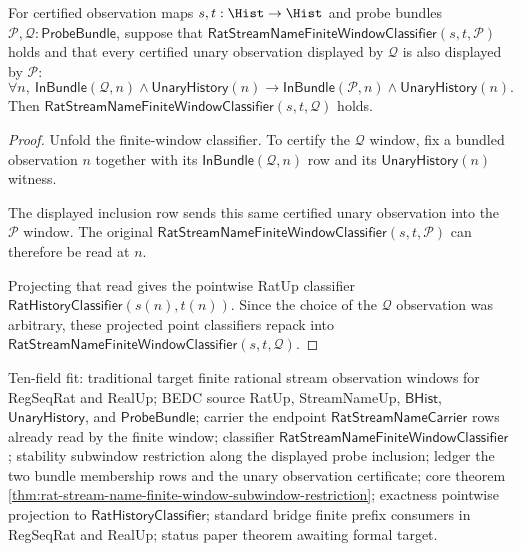 \begin{theorem}
\label{thm:rat-stream-name-finite-window-subwindow-restriction}
For certified observation maps $s,t:\Hist\to\Hist$ and probe bundles
$\mathcal{P},\mathcal{Q}:\mathsf{ProbeBundle}$, suppose that
$\mathsf{RatStreamNameFiniteWindowClassifier}(s,t,\mathcal{P})$ holds and that
every certified unary observation displayed by $\mathcal{Q}$ is also displayed
by $\mathcal{P}$:
$$
\forall n,\ \mathsf{InBundle}(\mathcal{Q},n)\land\mathsf{UnaryHistory}(n)
\to
\mathsf{InBundle}(\mathcal{P},n)\land\mathsf{UnaryHistory}(n).
$$
Then $\mathsf{RatStreamNameFiniteWindowClassifier}(s,t,\mathcal{Q})$ holds.
\end{theorem}
\begin{proof}
Unfold the finite-window classifier. To certify the $\mathcal{Q}$ window, fix a
bundled observation $n$ together with its $\mathsf{InBundle}(\mathcal{Q},n)$ row
and its $\mathsf{UnaryHistory}(n)$ witness.

The displayed inclusion row sends this same certified unary observation into the
$\mathcal{P}$ window. The original
$\mathsf{RatStreamNameFiniteWindowClassifier}(s,t,\mathcal{P})$ can therefore be
read at $n$.

Projecting that read gives the pointwise RatUp classifier
$\mathsf{RatHistoryClassifier}(s(n),t(n))$. Since the choice of the
$\mathcal{Q}$ observation was arbitrary, these projected point classifiers
repack into $\mathsf{RatStreamNameFiniteWindowClassifier}(s,t,\mathcal{Q})$.
\end{proof}

Ten-field fit: traditional target finite rational stream observation windows
for RegSeqRat and RealUp; BEDC source RatUp, StreamNameUp, $\mathsf{BHist}$,
$\mathsf{UnaryHistory}$, and $\mathsf{ProbeBundle}$; carrier the endpoint
$\mathsf{RatStreamNameCarrier}$ rows already read by the finite window;
classifier $\mathsf{RatStreamNameFiniteWindowClassifier}$; stability subwindow
restriction along the displayed probe inclusion; ledger the two bundle
membership rows and the unary observation certificate; core theorem
\autoref{thm:rat-stream-name-finite-window-subwindow-restriction}; exactness
pointwise projection to $\mathsf{RatHistoryClassifier}$; standard bridge finite
prefix consumers in RegSeqRat and RealUp; status paper theorem awaiting formal
target.

